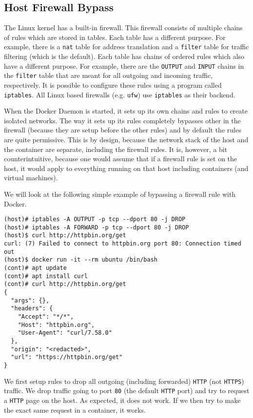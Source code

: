 \subsection{Host Firewall Bypass}\label{subsection:iptables}
The Linux kernel has a built-in firewall. This firewall consists of multiple chains of rules which are stored in tables. Each table has a different purpose. For example, there is a \lstinline{nat} table for address translation and a \lstinline{filter} table for traffic filtering (which is the default).
Each table has chains of ordered rules which also have a different purpose. For example, there are the \lstinline{OUTPUT} and \lstinline{INPUT} chains in the \lstinline{filter} table that are meant for all outgoing and incoming traffic, respectively.
It is possible to configure these rules using a program called \lstinline{iptables}. All Linux based firewalls (e.g. \lstinline{ufw}) use \lstinline{iptables} as their backend.

\hfill

When the Docker Daemon is started, it sets up its own chains and rules to create isolated networks. The way it sets up its rules completely bypasses other in the firewall (because they are setup before the other rules) and by default the rules are quite permissive. This is by design, because the network stack of the host and the container are separate, including the firewall rules. It is, however, a bit counterintuitive, because one would assume that if a firewall rule is set on the host, it would apply to everything running on that host including containers (and virtual machines).

\hfill

We will look at the following simple example of bypassing a firewall rule with Docker.

\begin{lstlisting}
(host)# iptables -A OUTPUT -p tcp --dport 80 -j DROP
(host)# iptables -A FORWARD -p tcp --dport 80 -j DROP
(host)$ curl http://httpbin.org/get
curl: (7) Failed to connect to httpbin.org port 80: Connection timed out
(host)$ docker run -it --rm ubuntu /bin/bash
(cont)# apt update
(cont)# apt install curl
(cont)# curl http://httpbin.org/get
{
  "args": {},
  "headers": {
    "Accept": "*/*",
    "Host": "httpbin.org",
    "User-Agent": "curl/7.58.0"
  },
  "origin": "<redacted>",
  "url": "https://httpbin.org/get"
}
\end{lstlisting}

We first setup rules to drop all outgoing (including forwarded) \lstinline{HTTP} (not \lstinline{HTTPS}) traffic. We drop traffic going to port \lstinline{80} (the default \lstinline{HTTP} port) and try to request a \lstinline{HTTP} page on the host. As expected, it does not work. If we then try to make the exact same request in a container, it works.

